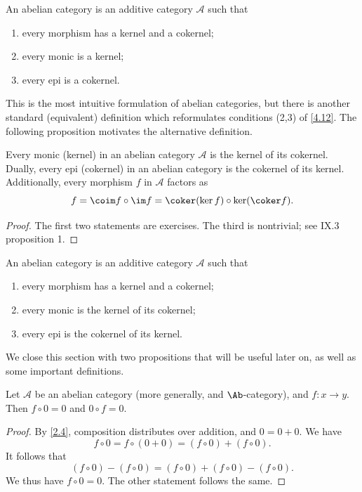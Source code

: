 \begin{definition}[\cite{ml}]\label{4.13}
	An abelian category is an additive category $\mathcal{A} $ such that
	\begin{enumerate}
		\item every morphism has a kernel and a cokernel;
		\item every monic is a kernel;
		\item every epi is a cokernel.
	\end{enumerate}
\end{definition}

This is the most intuitive formulation of abelian categories, but there is another standard (equivalent) definition which reformulates conditions (2,3) of \cref{4.12}. The following proposition motivates the alternative definition.

\begin{proposition}\label{4.14}
	Every monic (kernel) in an abelian category $\mathcal{A} $ is the kernel of its cokernel. Dually, every epi (cokernel) in an abelian category is the cokernel of its kernel. Additionally, every morphism $f$ in $\mathcal{A} $ factors as
	\[
		f=\coim f\circ \im f=\coker (\ker f)\circ \ker (\coker f)
	.\]
\end{proposition}
\begin{proof}
	The first two statements are exercises. The third is nontrivial; see \cite{ml} IX.3 proposition 1.
\end{proof}

\begin{definition}\label{4.15}
	An abelian category is an additive category $\mathcal{A} $ such that
	\begin{enumerate}
		\item every morphism has a kernel and a cokernel;
		\item every monic is the kernel of its cokernel;
		\item every epi is the cokernel of its kernel.
	\end{enumerate}
\end{definition}

We close this section with two propositions that will be useful later on, as well as some important definitions.

\begin{lemma}\label{4.16}
	Let $\mathcal{A} $ be an abelian category (more generally, and $\Ab $-category), and $f : x \to y$. Then $f\circ 0=0$ and $0\circ f=0$.
\end{lemma}
\begin{proof}
	By \cref{2.4}, composition distributes over addition, and $0=0+0$. We have
	\[
		f\circ 0=f\circ (0+0)=(f\circ 0)+(f\circ 0)
	.\]
	It follows that
	\[
		(f\circ 0)-(f\circ 0)=(f\circ 0)+(f\circ 0)-(f\circ 0)
	.\]
	We thus have $f\circ 0=0$. The other statement follows the same.
\end{proof}

